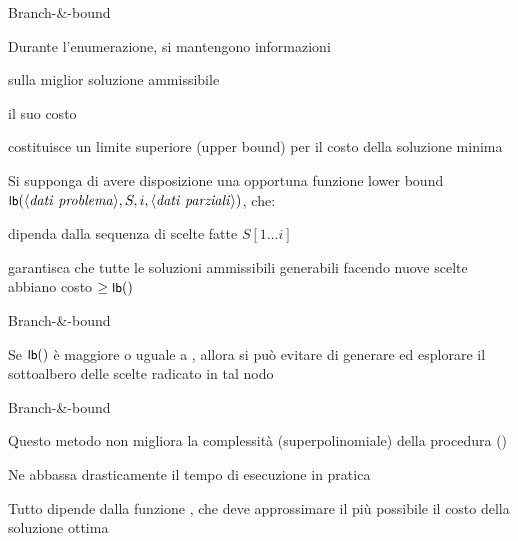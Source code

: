 \begin{frame}{Branch-\&-bound}

\vspace{-9pt}
\begin{myboxtitle}
\BIL
\item Durante l'enumerazione, si mantengono informazioni 
\BI
\item sulla miglior soluzione ammissibile \alert{\Minsol} 
\item il suo costo \alert{\Mincost}
\EI
\item \Mincost costituisce un \alert{limite superiore} (\alert{upper bound})
per il costo della soluzione minima
\EIL
\end{myboxtitle}

\begin{myboxtitle}
\BIL
\item Si supponga di avere disposizione una opportuna funzione \alert{lower bound} $\textsf{{\small lb}}(\langle \mathit{dati\ problema} \rangle, S, i, \langle \mathit{dati\ parziali} \rangle)$, che:
  \BI 
  \item dipenda dalla sequenza di scelte fatte $S[1  \ldots i]$
  \item garantisca che tutte le soluzioni ammissibili generabili facendo
nuove scelte abbiano costo $\geq \textsf{{\small lb}}()$
  \EI
\EIL
\end{myboxtitle}
    
\end{frame}

\begin{frame}{Branch-\&-bound}

\vspace{-9pt}
\begin{myboxtitle}[Potatura]
Se $\textsf{{\small lb}}()$ è maggiore o uguale a \Mincost, allora si può
evitare di generare ed esplorare il sottoalbero delle scelte radicato in tal
nodo
\end{myboxtitle}

\end{frame}

\begin{frame}{Branch-\&-bound}

\vspace{-9pt}
\begin{myboxtitle}[Note]
\BIL
\item Questo metodo non migliora la complessità (superpolinomiale) della procedura \enumerazione()
\item Ne abbassa drasticamente il tempo di esecuzione in pratica
\item Tutto dipende dalla funzione \LB, che deve approssimare il più  possibile il costo della soluzione ottima
\EIL
\end{myboxtitle}

\end{frame}

